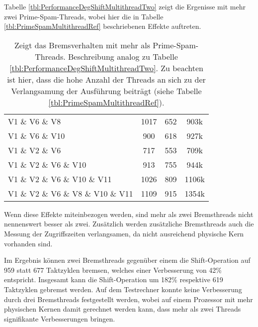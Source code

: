 Tabelle \ref{tbl:PerformanceDegShiftMultithreadTwo} zeigt die Ergenisse mit mehr zwei Prime-Spam-Threads, wobei hier die in Tabelle \ref{tbl:PrimeSpamMultithreadRef} beschriebenen Effekte auftreten.

\begin{table}[h]
\caption{Zeigt das Bremsverhalten mit mehr als Prime-Spam-Threads. Beschreibung analog zu Tabelle \ref{tbl:PerformanceDegShiftMultithreadTwo}. Zu beachten ist hier, dass die hohe Anzahl der Threads an sich zu der Verlangsamung der Ausführung beiträgt (siehe Tabelle \ref{tbl:PrimeSpamMultithreadRef}).}
\label{tbl:PerformanceDegShiftMultithreadThreePlus}
\begin{tabular}{lccc}
V1 \& V6 \& V8                             & 1017  & 652 & 903k    \\
V1 \& V6 \& V10                            & 900   & 618 & 927k    \\
V1 \& V2 \& V6                             & 717   & 553 & 709k    \\
V1 \& V2 \& V6 \& V10                      & 913   & 755 & 944k    \\
V1 \& V2 \& V6 \& V10 \& V11               & 1026  & 809 & 1106k   \\
V1 \& V2 \& V6 \& V8 \& V10 \& V11         & 1109  & 915 & 1354k  
\end{tabular}
\end{table}

Wenn diese Effekte miteinbezogen werden, sind mehr als zwei Bremsthreads nicht nennenswert besser als zwei.
Zusätzlich werden zusätzliche Bremsthreads auch die Messung der Zugriffszeiten verlangsamen, da nicht ausreichend physische Kern vorhanden sind.

Im Ergebnis können zwei Bremsthreads gegenüber einem die Shift-Operation auf 959 statt 677 Taktzyklen bremsen, welches einer Verbesserung von 42\% entspricht.
Insgesamt kann die Shift-Operation um 182\% respektive 619 Taktzyklen gebremst werden.
Auf dem Testrechner konnte keine Verbesserung durch drei Bremsthreads festgestellt werden, wobei auf einem Prozessor mit mehr physischen Kernen damit gerechnet werden kann, dass mehr als zwei Threads signifikante Verbesserungen bringen.


%




